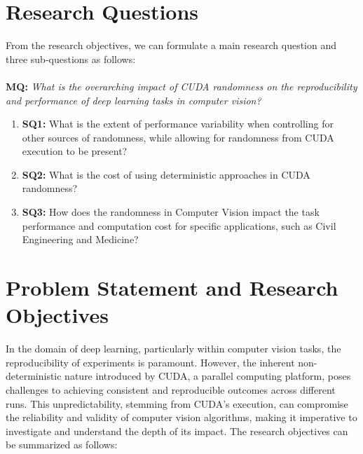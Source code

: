 \section{Research Questions} 
From the research objectives, we can formulate a main research question and three sub-questions as follows:
\\
\\
\textbf{MQ:} \textit{What is the overarching impact of CUDA randomness on the reproducibility and performance of deep learning tasks in computer vision?}

\begin{enumerate}
    \item \textbf{SQ1:} What is the extent of performance variability when controlling for other sources of randomness, while allowing for randomness from CUDA execution to be present?
    \item \textbf{SQ2:} What is the cost of using deterministic approaches in CUDA randomness?
    \item \textbf{SQ3:} How does the randomness in Computer Vision impact the task performance and computation cost for specific applications, such as Civil Engineering and Medicine?
\end{enumerate}

\section{Problem Statement and Research Objectives} 

In the domain of deep learning, particularly within computer vision tasks, the reproducibility of experiments is paramount. 
However, the inherent non-deterministic nature introduced by CUDA, a parallel computing platform, poses challenges to achieving 
consistent and reproducible outcomes across different runs. This unpredictability, stemming from CUDA's execution, can compromise 
the reliability and validity of computer vision algorithms, making it imperative to investigate and understand the depth of its 
impact. The research objectives can be summarized as follows:


